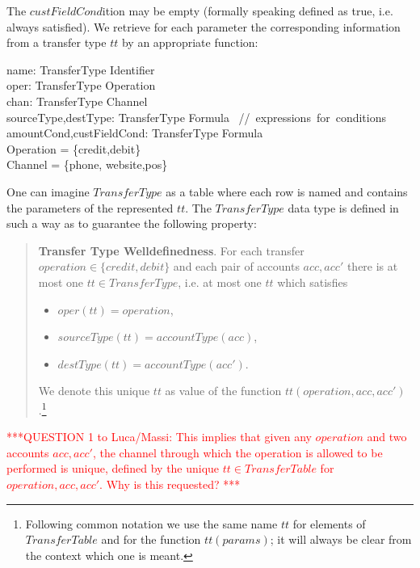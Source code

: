 The $custFieldCond$ition may be empty (formally speaking defined as true, i.e. always satisfied). We retrieve for each parameter the corresponding information from a transfer type $tt$ by an appropriate function:

\begin{asm}
name: TransferType \rightarrow Identifier \\
oper: TransferType \rightarrow Operation\\
chan: TransferType \rightarrow Channel \\
sourceType,destType: TransferType \rightarrow Formula 
       \mbox{ // expressions for conditions}\\
amountCond,custFieldCond: TransferType \rightarrow Formula\\
\WHERE \+
    Operation = \{credit,debit\} \\
    Channel = \{phone, website,pos\}
\end{asm} 

One can imagine $TransferType$ as a table where each row is named and contains the parameters of the represented $tt$. The $TransferType$ data type is defined in such a way as to guarantee the following property: 
\begin{quote} 
	{\bf Transfer Type Welldefinedness}. For each transfer $operation \in \{credit,debit\}$ and each pair of accounts $acc,acc'$ there is at most one $tt \in TransferType$, i.e. at most one $tt$ which satisfies
	\begin{itemize}
		\item $oper(tt) = operation$,
		\item $sourceType(tt)=accountType(acc)$,
		\item $destType(tt)=accountType(acc')$.
	\end{itemize} 
We denote this unique $tt$ as value of the function $tt(operation,acc,acc')$.\footnote{Following common notation we use the same name $tt$ for elements of $TransferTable$ and for the function $tt(params)$; it will always be clear from the context which one is meant.}
\end{quote}

\vspace{12pt}
\textcolor{red}{***QUESTION 1 to Luca/Massi: This implies that given any $operation$ and two accounts $acc,acc'$, the channel through which the operation is allowed to be performed is unique, defined by the unique $tt \in TransferTable$ for $operation,acc,acc'$. Why is this requested? ***}
\vspace{12pt}

